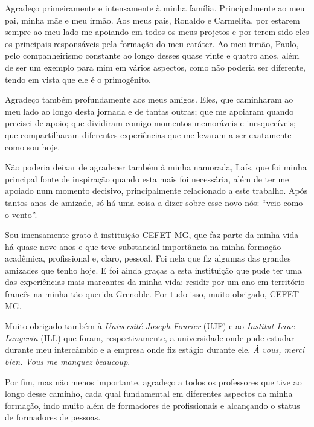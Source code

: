 %
%

\begin{agradecimentos}

Agradeço primeiramente e intensamente à minha família. Principalmente ao meu pai, minha mãe e meu irmão. Aos meus pais, Ronaldo e Carmelita, por estarem sempre ao meu lado me apoiando em todos os meus projetos e por terem sido eles os principais responsáveis pela formação do meu caráter. Ao meu irmão, Paulo, pelo companheirismo constante ao longo desses quase vinte e quatro anos, além de ser um exemplo para mim em vários aspectos, como não poderia ser diferente, tendo em vista que ele é o primogênito.

Agradeço também profundamente aos meus amigos. Eles, que caminharam ao meu lado ao longo desta jornada e de tantas outras; que me apoiaram quando precisei de apoio; que dividiram comigo momentos memoráveis e inesquecíveis; que compartilharam diferentes experiências que me levaram a ser exatamente como sou hoje.

Não poderia deixar de agradecer também à minha namorada, Laís, que foi minha principal fonte de inspiração quando esta mais foi necessária, além de ter me apoiado num momento decisivo, principalmente relacionado a este trabalho. Após tantos anos de amizade, só há uma coisa a dizer sobre esse novo nós: ``veio como o vento''.

Sou imensamente grato à instituição CEFET-MG, que faz parte da minha vida há quase nove anos e que teve substancial importância na minha formação acadêmica, profissional e, claro, pessoal. Foi nela que fiz algumas das grandes amizades que tenho hoje. E foi ainda graças a esta instituição que pude ter uma das experiências mais marcantes da minha vida: residir por um ano em território francês na minha tão querida Grenoble. Por tudo isso, muito obrigado, CEFET-MG.

Muito obrigado também à \textit{Université Joseph Fourier} (UJF) e ao \textit{Institut Laue-Langevin} (ILL) que foram, respectivamente, a universidade onde pude estudar durante meu intercâmbio e a empresa onde fiz estágio durante ele. \textit{À vous, merci bien. Vous me manquez beaucoup}.

Por fim, mas não menos importante, agradeço a todos os professores que tive ao longo desse caminho, cada qual fundamental em diferentes aspectos da minha formação, indo muito além de formadores de profissionais e alcançando o status de formadores de pessoas.

\end{agradecimentos}
